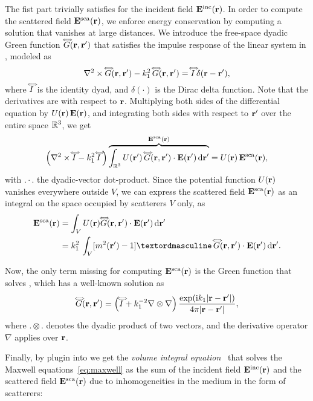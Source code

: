{The fist part trivially satisfies  for the incident field $\mathbf{E}^\text{inc}(\mathbf{r})$. In order to compute the scattered field $\mathbf{E}^\text{sca}(\mathbf{r})$, we enforce energy conservation by computing a solution that vanishes at large distances. We introduce the free-space dyadic Green function $\accentset{\Longleftrightarrow}{G}(\mathbf{r},\mathbf{r}')$ that satisfies the impulse response of the linear system in , modeled as 
\begin{equation}
 \nabla^2\times\accentset{\Longleftrightarrow}{G}(\mathbf{r},\mathbf{r}') - k_1^2\,\accentset{\Longleftrightarrow}{G}(\mathbf{r},\mathbf{r}') = \accentset{\Longleftrightarrow}{I}\,\delta(\mathbf{r}-\mathbf{r}'),
 \label{eq:diffgreen}
 \end{equation}
where $\accentset{\Longleftrightarrow}{I}$ is the identity dyad, and $\delta(\cdot)$ is the Dirac delta function. Note that the derivatives are with respect to $\mathbf{r}$. Multiplying both sides of the differential equation by $U(\mathbf{r})\,\mathbf{E}(\mathbf{r})$, and integrating both sides with respect to $\mathbf{r}'$ over the entire space $\mathbb{R}^3$, we get
\begin{align}
\left( \nabla^2\times\accentset{\Longleftrightarrow}{I} - k_1^2\,\accentset{\Longleftrightarrow}{I}\, \right)\overbrace{\int_{\mathbb{R}^3} U(\mathbf{r}')\, \accentset{\Longleftrightarrow}{G}(\mathbf{r},\mathbf{r}') \cdot \mathbf{E}(\mathbf{r}')  \,\text{d}\mathbf{r}'}^{\mathbf{E}^\text{sca}(\mathbf{r})} = U(\mathbf{r})\,\mathbf{E}^\text{sca}(\mathbf{r}),
\end{align}
%
with $.\cdot.$ the dyadic-vector dot-product. 
Since the potential function $U(\mathbf{r})$ vanishes everywhere outside $V$, we can express the scattered field $\mathbf{E}^\text{sca}(\mathbf{r})$ as an integral on the space occupied by scatterers $V$ only, as
\begin{align}
\ScaEField(\px) & = \int_V U(\px)  \sGreen(\px,\px') \cdot \EField(\px') \diff{\px'} \nonumber \\
& = k_1^2\,\int_V [\sIOR^2(\px')-1] º\, \sGreen(\px,\px') \cdot \EField(\px') \diff{\px'}.
\label{eq:vriscatt}
\end{align}

Now, the only term missing for computing $\mathbf{E}^\text{sca}(\mathbf{r})$ is the Green function that solves , which has a well-known solution as
\begin{equation}
\accentset{\Longleftrightarrow}{G}(\mathbf{r},\mathbf{r}') = \left(\accentset{\Longleftrightarrow}{I}+k_1^{-2}\nabla\otimes\nabla\right) \frac{\exp(\text{i} k_1 |\mathbf{r}-\mathbf{r}'|)}{4\pi|\mathbf{r}-\mathbf{r}'|},
\label{eq:greenfunc}
\end{equation}
where $. \otimes .$ denotes the dyadic product of two vectors, and the derivative operator $\nabla$ applies over $\mathbf{r}$.

Finally, by plugin  into  we get the \emph{volume integral equation}~\cite[Sec.3.1]{mishchenko2006multiple} that solves the Maxwell equations~\eqref{eq:maxwell} as the sum of the incident field $\mathbf{E}^\text{inc}(\mathbf{r})$ and the scattered field $\mathbf{E}^\text{sca}(\mathbf{r})$ due to inhomogeneities in the medium in the form of scatterers:
}
